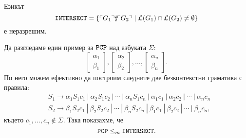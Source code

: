 \begin{corollary}\label{cor:pcp:grammar-intersect}
  Езикът 
  \[\texttt{INTERSECT} = \{\ulcorner{G_1}\urcorner\sharp\ulcorner{G_2}\urcorner \mid \mathcal{L}(G_1) \cap \mathcal{L}(G_2) \neq \emptyset \}\]
  е неразрешим.
\end{corollary}
\begin{hint}
  Да разгледаме един пример за $\texttt{PCP}$ над азбуката $\Sigma$:
  \[\begin{bmatrix} \alpha_1\\ \beta_1\end{bmatrix},\begin{bmatrix} \alpha_2\\ \beta_2\end{bmatrix},\dots,\begin{bmatrix} \alpha_n\\ \beta_n\end{bmatrix}.\]
  По него можем ефективно да построим следните две безконтекстни граматика с правила:
  \begin{align*}
    & S_1 \to \alpha_1S_1 c_1\ |\ \alpha_2 S_1 c_2\ |\ \cdots\ |\ \alpha_n S_1 c_n\ |\ \alpha_1c_1\ |\ \alpha_2c_2\ |\ \cdots\ |\ \alpha_nc_n\\
    & S_2 \to \beta_1S_2 c_1\ |\ \beta_2 S_2 c_2\ |\ \cdots\ |\ \beta_n S_2 c_n\ |\ \beta_1c_1\ |\ \beta_2c_2\ |\ \cdots\ |\ \beta_nc_n,
  \end{align*}
  където $c_1,\dots,c_n \not \in \Sigma$.
  Така показахме, че
  \[\texttt{PCP} \leq_m \texttt{INTERSECT}.\]
\end{hint}



